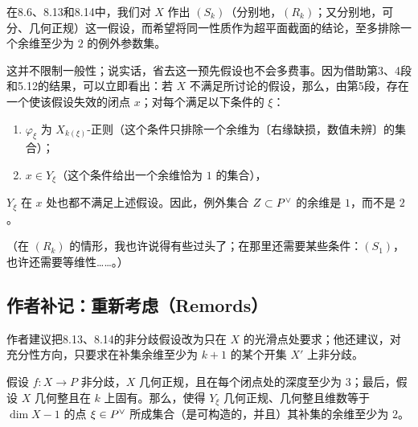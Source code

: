 在8.6、8.13和8.14中，我们对 $X$ 作出 $(S_k)$（分别地，$(R_k)$；又分别地，可分、几何正规）这一假设，而希望将同一性质作为超平面截面的结论，至多排除一个余维至少为 $2$ 的例外参数集。

这并不限制一般性；说实话，省去这一预先假设也不会多费事。因为借助第3、4段和5.12的结果，可以立即看出：若 $X$ 不满足所讨论的假设，那么，由第5段，存在一个使该假设失效的闭点 $x$；对每个满足以下条件的 $\xi$：
\begin{enumerate}
\item $\varphi_\xi$ 为 $X_{k(\xi)}$-正则（这个条件只排除一个余维为〔右缘缺损，数值未辨〕的集合）；
\item $x\in Y_\xi$（这个条件给出一个余维恰为 $1$ 的集合），
\end{enumerate}
$Y_\xi$ 在 $x$ 处也都不满足上述假设。因此，例外集合 $Z\subset P^\vee$ 的余维是 $1$，而不是 $2$。

（在 $(R_k)$ 的情形，我也许说得有些过头了；在那里还需要某些条件：$(S_1)$，也许还需要等维性……。）

\subsection*{作者补记：重新考虑（Remords）}
作者建议把8.13、8.14的非分歧假设改为只在 $X$ 的光滑点处要求；他还建议，对充分性方向，只要求在补集余维至少为 $k+1$ 的某个开集 $X'$ 上非分歧。

假设 $f\colon X\to P$ 非分歧，$X$ 几何正规，且在每个闭点处的深度至少为 $3$；最后，假设 $X$ 几何整且在 $k$ 上固有。那么，使得 $Y_\xi$ 几何正规、几何整且维数等于 $\dim X-1$ 的点 $\xi\in P^\vee$ 所成集合（是可构造的，并且）其补集的余维至少为 $2$。

